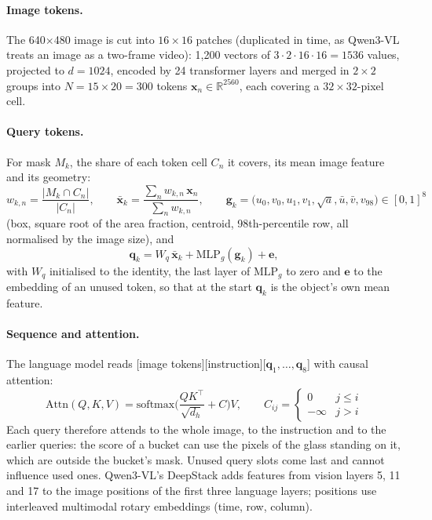 \documentclass[10pt,a4paper]{article}
\newcommand{\R}{\mathbb{R}}
\begin{document}
\paragraph{Image tokens.} The 640$\times$480 image is cut into $16{\times}16$ patches (duplicated in time, as Qwen3-VL treats an
image as a two-frame video): 1{,}200 vectors of $3\cdot2\cdot16\cdot16=1536$ values, projected to $d=1024$, encoded by 24
transformer layers and merged in $2{\times}2$ groups into $N=15\times20=300$ tokens $\bm x_n\in\R^{2560}$, each covering a
$32{\times}32$-pixel cell.

\paragraph{Query tokens.} For mask $M_k$, the share of each token cell $C_n$ it covers, its mean image feature and its geometry:
\begin{equation}
w_{k,n} = \frac{|M_k\cap C_n|}{|C_n|},\qquad
\bar{\bm x}_k = \frac{\sum_n w_{k,n}\,\bm x_n}{\sum_n w_{k,n}},\qquad
\bm g_k = \big(u_0,v_0,u_1,v_1,\sqrt{a},\bar u,\bar v,v_{98}\big)\in[0,1]^8
\end{equation}
(box, square root of the area fraction, centroid, 98th-percentile row, all normalised by the image size), and
\begin{equation}
\bm q_k = W_q\,\bar{\bm x}_k + \mathrm{MLP}_g(\bm g_k) + \bm e,
\end{equation}
with $W_q$ initialised to the identity, the last layer of $\mathrm{MLP}_g$ to zero and $\bm e$ to the embedding of an unused
token, so that at the start $\bm q_k$ is the object's own mean feature.

\paragraph{Sequence and attention.} The language model reads [image tokens][instruction][$\bm q_1,\dots,\bm q_8$] with causal
attention:
\begin{equation}
\mathrm{Attn}(Q,K,V) = \mathrm{softmax}\!\Big(\frac{QK^\top}{\sqrt{d_h}} + C\Big)V,\qquad C_{ij} = \begin{cases}0 & j\leq i\\ -\infty & j>i\end{cases}
\end{equation}
Each query therefore attends to the whole image, to the instruction and to the earlier queries: the score of a bucket can use the
pixels of the glass standing on it, which are outside the bucket's mask. Unused query slots come last and cannot influence used
ones. Qwen3-VL's DeepStack adds features from vision layers 5, 11 and 17 to the image positions of the first three language
layers; positions use interleaved multimodal rotary embeddings (time, row, column).
\end{document}

